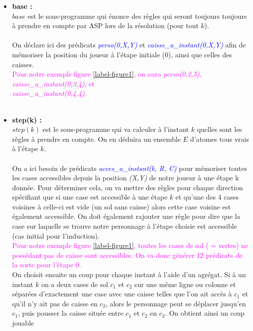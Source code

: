 \documentclass[10pt,a4paper]{article}
\begin{document}
\begin{itemize}
	\item \textbf{base :}\\
		$base$ est le sous-programme qui énonce des règles qui seront toujours toujours à prendre en compte par ASP lors de la résolution (pour tout $k$).\\ \\
		On déclare ici des prédicats \emph{\textcolor{blue}{perso(0,X,Y)}} et \emph{\textcolor{blue}{caisse\_a\_instant(0,X,Y)}} afin de mémoriser la position du joueur à l'étape initiale (0), ainsi que celles des caisses.\\
		\textcolor{magenta}{Pour notre exemple figure \ref{label-figure1}, on aura \emph{perso(0,2,5), caisse\_a\_instant(0,3,4)}, et \\
		\emph{caisse\_a\_instant(0,4,4).}}\\ \\
	\item \textbf{step(k) :}\\
		$step(k)$ est le sous-programme qui va calculer à l'instant $k$ quelles sont les règles à prendre en compte. On en déduira un ensemble $E$ d'atomes tous vrais à l'étape $k$.\\ \\
		On a ici besoin de prédicats \emph{\textcolor{blue}{acces\_a\_instant(k, R, C)}} pour mémoriser toutes les cases accessibles depuis la position \emph{(X,Y)} de notre joueur à une étape k donnée. Pour déterminer 
		cela, on va mettre des règles pour chaque direction spécifiant que si une case est accessible à une étape $k$ et qu'une des 4 cases voisines à celle-ci est vide (un sol sans caisse) alors cette case voisine est 
		également accessible. On doit également rajouter une règle pour dire que la case sur laquelle se trouve notre personnage à l'étape choisie est accessible (cas initial pour l'induction).\\
		\textcolor{magenta}{Pour notre exemple figure \ref{label-figure1}, toutes les cases de sol ( = vertes) ne possédant pas de caisse sont accessibles. On va donc générer 12 prédicats de la sorte pour l'étape 0.}\\
		On choisit ensuite un coup pour chaque instant à l'aide d'un agrégat. Si à un instant $k$ on a deux cases de sol $c_1$ et $c_2$ sur une même ligne ou colonne et séparées d'exactement une case avec une caisse telles 
		que l'on ait accès à $c_1$ et qu'il n'y ait pas de caisse en $c_2$, alors le personnage peut se déplacer jusqu'en $c_1$, puis pousser la caisse située entre $c_1$ et $c_2$ en $c_2$. On obtient ainsi un coup jouable 

\end{itemize}
\end{document}

